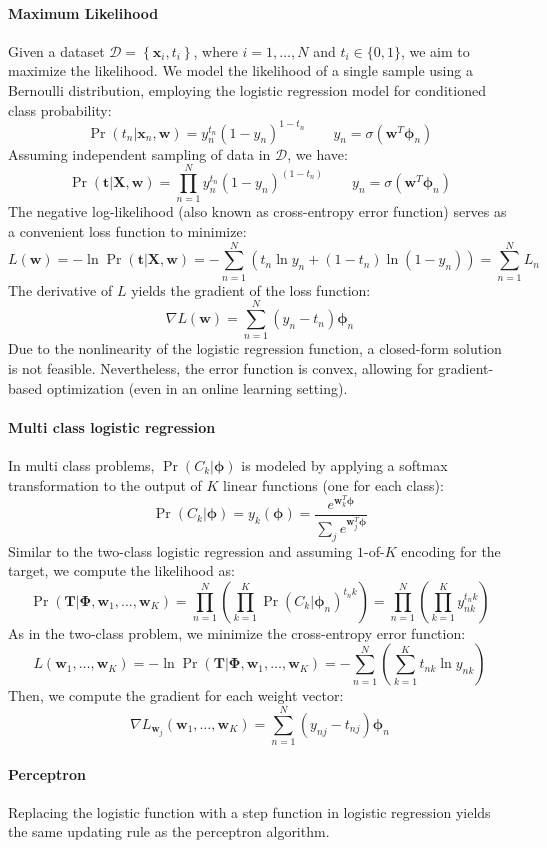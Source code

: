 \paragraph*{Maximum Likelihood}
Given a dataset $\mathcal{D}=\left\{ \textbf{x}_i,t_i \right\}$, where $i=1,\dots,N$ and $t_i \in \{0,1\}$, we aim to maximize the likelihood.
We model the likelihood of a single sample using a Bernoulli distribution, employing the logistic regression model for conditioned class probability:
\[\Pr(t_n|\textbf{x}_n,\textbf{w})=y_n^{t_n}{\left( 1-y_n \right)}^{1-t_n} \qquad y_n=\sigma(\textbf{w}^T\boldsymbol{\phi}_n)\]
Assuming independent sampling of data in $\mathcal{D}$, we have:
\[\Pr(\textbf{t}|\textbf{X},\textbf{w})=\prod_{n=1}^N y_n^{t_n}{\left( 1-y_n \right)}^{(1-t_n)} \qquad y_n=\sigma(\textbf{w}^T\boldsymbol{\phi}_n)\]
The negative log-likelihood (also known as cross-entropy error function) serves as a convenient loss function to minimize:
\[L(\textbf{w})=-\ln \Pr(\textbf{t}|\textbf{X},\textbf{w})=-\sum_{n=1}^N \left( t_n\ln y_n +(1-t_n) \ln (1-y_n) \right) = \sum_{n=1}^N L_n\]
The derivative of $L$ yields the gradient of the loss function:
\[\nabla L(\textbf{w})=\sum_{n=1}^N\left( y_n-t_n \right) \boldsymbol{\phi}_n\]
Due to the nonlinearity of the logistic regression function, a closed-form solution is not feasible. 
Nevertheless, the error function is convex, allowing for gradient-based optimization (even in an online learning setting).

\paragraph*{Multi class logistic regression}
In multi class problems, $\Pr(C_k|\boldsymbol{\phi})$ is modeled by applying a softmax transformation to the output of $K$ linear functions (one for each class):
\[\Pr(C_k|\boldsymbol{\phi})=y_k(\boldsymbol{\phi})=\dfrac{e^{\textbf{w}_k^T\boldsymbol{\phi}}}{\sum_j e^{\textbf{w}_j^T\boldsymbol{\phi}}}\]
Similar to the two-class logistic regression and assuming $1$-of-$K$  encoding for the target, we compute the likelihood as:
\[\Pr(\textbf{T}|\boldsymbol{\Phi},\textbf{w}_1,\dots,\textbf{w}_K)=\prod_{n=1}^N \left( \prod_{k=1}^K \Pr{(C_k|\boldsymbol{\phi}_n)}^{t_n k} \right)=\prod_{n=1}^N \left( \prod_{k=1}^K y^{t_n k}_{nk} \right)\]
As in the two-class problem, we minimize the cross-entropy error function:
\[L(\textbf{w}_1,\dots,\textbf{w}_K)=-\ln \Pr(\textbf{T}|\boldsymbol{\Phi},\textbf{w}_1,\dots,\textbf{w}_K)=-\sum_{n=1}^N \left(\sum_{k=1}^K t_{nk}\ln y_{nk} \right)\]
Then, we compute the gradient for each weight vector:
\[\nabla L_{\textbf{w}_j}(\textbf{w}_1,\dots,\textbf{w}_K)=\sum_{n=1}^N\left( y_{nj}-t_{nj} \right) \boldsymbol{\phi}_n\]

\paragraph*{Perceptron}
Replacing the logistic function with a step function in logistic regression yields the same updating rule as the perceptron algorithm.